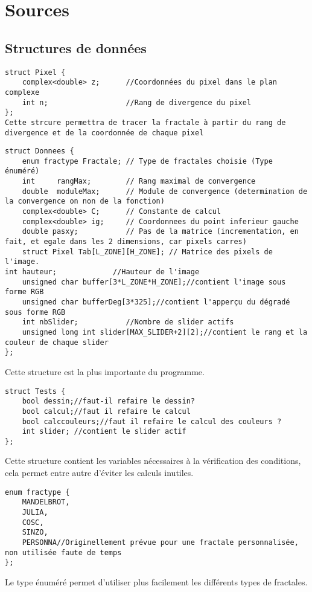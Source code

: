 \documentclass[a4paper,11pt]{article} \usepackage[T1]{fontenc} \usepackage[utf8]{inputenc} \usepackage[francais]{babel}
\begin{document}
\section{Sources}
\subsection{Structures de données}
\begin{lstlisting}
struct Pixel {
    complex<double> z;      //Coordonnées du pixel dans le plan complexe
    int n;                  //Rang de divergence du pixel
};
Cette strcure permettra de tracer la fractale à partir du rang de divergence et de la coordonnée de chaque pixel
\end{lstlisting}
\begin{lstlisting}
struct Donnees {
    enum fractype Fractale; // Type de fractales choisie (Type énuméré)
    int     rangMax;        // Rang maximal de convergence
    double  moduleMax;      // Module de convergence (determination de la convergence on non de la fonction)
    complex<double> C;      // Constante de calcul
    complex<double> ig;     // Coordonnees du point inferieur gauche
    double pasxy;           // Pas de la matrice (incrementation, en fait, et egale dans les 2 dimensions, car pixels carres)
    struct Pixel Tab[L_ZONE][H_ZONE]; // Matrice des pixels de l'image.
int hauteur;             //Hauteur de l'image
    unsigned char buffer[3*L_ZONE*H_ZONE];//contient l'image sous forme RGB
    unsigned char bufferDeg[3*325];//contient l'apperçu du dégradé sous forme RGB
    int nbSlider;           //Nombre de slider actifs
    unsigned long int slider[MAX_SLIDER+2][2];//contient le rang et la couleur de chaque slider
};

\end{lstlisting}
Cette structure est la plus importante du programme.

\begin{lstlisting}
struct Tests {
    bool dessin;//faut-il refaire le dessin?
    bool calcul;//faut il refaire le calcul
    bool calccouleurs;//faut il refaire le calcul des couleurs ?
    int slider; //contient le slider actif
};
\end{lstlisting}
Cette structure contient les variables nécessaires à la vérification des conditions, cela permet entre autre d’éviter les calculs inutiles.

\begin{lstlisting}
enum fractype {
    MANDELBROT,
    JULIA,
    COSC,
    SINZO,
    PERSONNA//Originellement prévue pour une fractale personnalisée, non utilisée faute de temps
};
\end{lstlisting}
Le type énuméré permet d’utiliser plus facilement les différents types de fractales.
\end{document}
